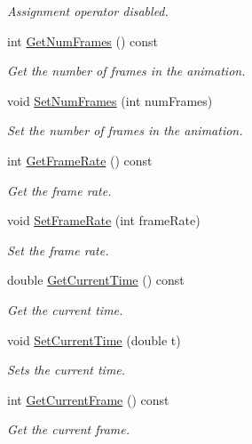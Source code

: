\begin{DoxyCompactItemize}
\begin{DoxyCompactList}\small\item\em Assignment operator disabled. \end{DoxyCompactList}\item 
int \hyperlink{class_c_timeline_a074dbbf92a511826bce794b09865019d}{Get\+Num\+Frames} () const 
\begin{DoxyCompactList}\small\item\em Get the number of frames in the animation. \end{DoxyCompactList}\item 
void \hyperlink{class_c_timeline_a630bf5d1ef949b8fe7f8417e7a7dea5f}{Set\+Num\+Frames} (int num\+Frames)
\begin{DoxyCompactList}\small\item\em Set the number of frames in the animation. \end{DoxyCompactList}\item 
int \hyperlink{class_c_timeline_a78ce3a20bd9f99d2f02123642d552982}{Get\+Frame\+Rate} () const 
\begin{DoxyCompactList}\small\item\em Get the frame rate. \end{DoxyCompactList}\item 
void \hyperlink{class_c_timeline_af10874504b3128c88b17ef3795aaa57e}{Set\+Frame\+Rate} (int frame\+Rate)
\begin{DoxyCompactList}\small\item\em Set the frame rate. \end{DoxyCompactList}\item 
double \hyperlink{class_c_timeline_acd50ce5a8064c562d5ab32d98ad04c0e}{Get\+Current\+Time} () const 
\begin{DoxyCompactList}\small\item\em Get the current time. \end{DoxyCompactList}\item 
void \hyperlink{class_c_timeline_acabdd623028b09cb08a9a9afcdeaeae9}{Set\+Current\+Time} (double t)
\begin{DoxyCompactList}\small\item\em Sets the current time. \end{DoxyCompactList}\item 
int \hyperlink{class_c_timeline_a87c72f53763f27ed9a695be6513c77d4}{Get\+Current\+Frame} () const 
\begin{DoxyCompactList}\small\item\em Get the current frame. \end{DoxyCompactList}\item 

\end{DoxyCompactItemize}
